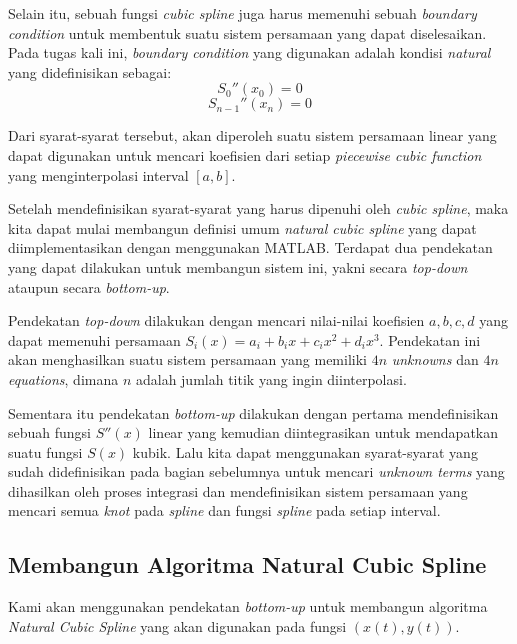 \documentclass[journal,12pt,onecolumn,a4paper]{IEEEtran}
\begin{document}
Selain itu, sebuah fungsi \emph{cubic spline} juga harus memenuhi sebuah \emph{boundary condition} untuk membentuk suatu sistem persamaan yang dapat diselesaikan. Pada tugas kali ini, \emph{boundary condition} yang digunakan adalah kondisi \emph{natural} yang didefinisikan sebagai:
\begin{equation}
	S_0''(x_0) = 0
\end{equation}
\begin{equation}
	S_{n-1}''(x_n) = 0
\end{equation}

Dari syarat-syarat tersebut, akan diperoleh suatu sistem persamaan linear yang dapat digunakan untuk mencari koefisien dari setiap \emph{piecewise cubic function} yang menginterpolasi interval \([a, b]\).

Setelah mendefinisikan syarat-syarat yang harus dipenuhi oleh \emph{cubic spline}, maka kita dapat mulai membangun definisi umum \emph{natural cubic spline} yang dapat diimplementasikan dengan menggunakan MATLAB. Terdapat dua pendekatan yang dapat dilakukan untuk membangun sistem ini, yakni secara \emph{top-down} ataupun secara \emph{bottom-up}.

Pendekatan \emph{top-down} dilakukan dengan mencari nilai-nilai koefisien \(a, b, c, d\) yang dapat memenuhi persamaan \(S_i(x) = a_i + b_ix + c_ix^2 + d_ix^3\). Pendekatan ini akan menghasilkan suatu sistem persamaan yang memiliki \(4n\) \emph{unknowns} dan \(4n\) \emph{equations}, dimana \(n\) adalah jumlah titik yang ingin diinterpolasi.

Sementara itu pendekatan \emph{bottom-up} dilakukan dengan pertama mendefinisikan sebuah fungsi \(S''(x)\) linear yang kemudian diintegrasikan untuk mendapatkan suatu fungsi \(S(x)\) kubik. Lalu kita dapat menggunakan syarat-syarat yang sudah didefinisikan pada bagian sebelumnya untuk mencari \emph{unknown terms} yang dihasilkan oleh proses integrasi dan mendefinisikan sistem persamaan yang mencari semua \emph{knot} pada \emph{spline} dan fungsi \emph{spline} pada setiap interval.

\subsection{Membangun Algoritma Natural Cubic Spline}
Kami akan menggunakan pendekatan \emph{bottom-up} untuk membangun algoritma \emph{Natural Cubic Spline} yang akan digunakan pada fungsi \((x(t), y(t))\).
\end{document}
